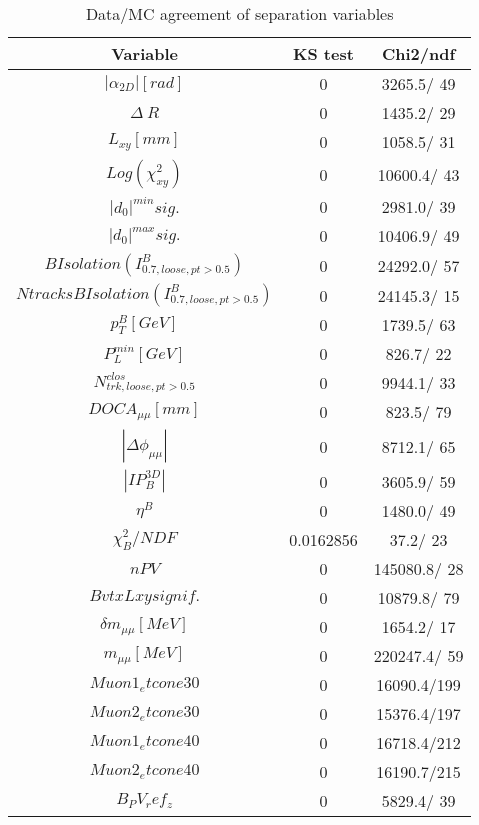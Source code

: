 \documentclass{article}
\begin{document}
\begin{table}[htbp]
\caption{\label{tab:sepVars}Data/MC agreement of separation variables}
\begin{center}
\begin{tabular}{c|c|c}
Variable & KS test & Chi2/ndf \\
\hline
$|\alpha_{2D}| [rad]$ & 0 & 3265.5/ 49\\
\hline
$\Delta~R$ & 0 & 1435.2/ 29\\
\hline
$L_{xy} [mm]$ & 0 & 1058.5/ 31\\
\hline
$Log(\chi^{2}_{xy})$ & 0 & 10600.4/ 43\\
\hline
$|d_{0}|^{min} sig.$ & 0 & 2981.0/ 39\\
\hline
$|d_{0}|^{max} sig.$ & 0 & 10406.9/ 49\\
\hline
$B Isolation (I^{B}_{0.7, loose, pt>0.5})$ & 0 & 24292.0/ 57\\
\hline
$Ntracks B Isolation (I^{B}_{0.7, loose, pt>0.5})$ & 0 & 24145.3/ 15\\
\hline
$p_{T}^{B} [GeV]$ & 0 & 1739.5/ 63\\
\hline
$P^{min}_{L} [GeV]$ & 0 & 826.7/ 22\\
\hline
$N^{clos}_{trk, loose, pt>0.5}$ & 0 & 9944.1/ 33\\
\hline
$DOCA_{\mu\mu} [mm]$ & 0 & 823.5/ 79\\
\hline
$|\Delta\phi_{\mu\mu}|$ & 0 & 8712.1/ 65\\
\hline
$|IP_{B}^{3D}|$ & 0 & 3605.9/ 59\\
\hline
$\eta^{B}$ & 0 & 1480.0/ 49\\
\hline
$\chi^{2}_{B}/NDF$ & 0.0162856 &  37.2/ 23\\
\hline
$nPV$ & 0 & 145080.8/ 28\\
\hline
$BvtxLxy signif.$ & 0 & 10879.8/ 79\\
\hline
$\delta m_{\mu\mu} [MeV]$ & 0 & 1654.2/ 17\\
\hline
$m_{\mu\mu} [MeV]$ & 0 & 220247.4/ 59\\
\hline
$Muon1_etcone30$ & 0 & 16090.4/199\\
\hline
$Muon2_etcone30$ & 0 & 15376.4/197\\
\hline
$Muon1_etcone40$ & 0 & 16718.4/212\\
\hline
$Muon2_etcone40$ & 0 & 16190.7/215\\
\hline
$B_PV_ref_z$ & 0 & 5829.4/ 39\\
\hline
\end{tabular}
\end{center}
\end{table}
\end{document}
